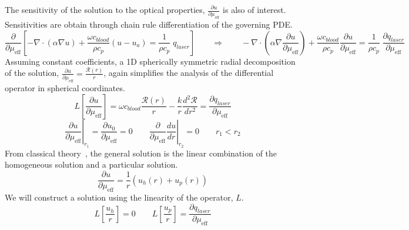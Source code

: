 \documentclass{article}         %
\theoremstyle{definition}
\theoremstyle{remark}
\begin{document}
The sensitivity of the solution to the optical properties, $\frac{\partial
u}{\partial \mu_\text{eff}}$ is also of
interest.
Sensitivities are obtain through chain rule differentiation of the governing
PDE.
\[
\frac{\partial}{\partial \mu_\text{eff}}
\left[
 -\nabla \cdot \left(   \alpha \nabla u  \right) 
 + \frac{\omega c_\textit{blood}}{\rho c_p} (u  - u_a )
 = \frac{1}{\rho c_p} \; q_{laser}
\right]
\qquad
\Rightarrow
\qquad
 -\nabla \cdot  \left(   \alpha \nabla  \frac{\partial u}{\partial \mu_\text{eff}} \right) 
 + \frac{\omega c_\textit{blood}}{\rho c_p} \frac{\partial u}{\partial \mu_\text{eff}}  
 = \frac{1}{\rho c_p} \;
   \frac{\partial q_{laser}}{\partial \mu_\text{eff}}
\]
Assuming constant coefficients, 
a 1D spherically symmetric radial decomposition 
of the solution,
$ \frac{\partial u}{\partial \mu_\text{eff}} = \frac{\mathcal{R}(r)}{r}$, again simplifies the analysis of the differential operator in
spherical coordinates.
\[
   L \left[\frac{\partial u}{\partial \mu_\text{eff}}\right] = 
    \omega c_\textit{blood}  \frac{ \mathcal{R}(r)}{r} 
   -
    \frac{k }{r}   \frac{d^2 \mathcal{R}}{dr^2}
   = 
   \frac{\partial q_{laser}}{\partial \mu_\text{eff}}
\]
\[
 \left.
 \frac{\partial u}{\partial \mu_\text{eff}} 
  \right|_{r_1}
  = 
 \frac{\partial u_0}{\partial \mu_\text{eff}} = 0
  \qquad
  \left. \frac{\partial }{\partial \mu_\text{eff}}
   \frac{d u}{dr} \right|_{r_2}  = 0
  \qquad
   r_1 < r_2
\]
From classical theory~\cite{boyce1992elementary}, 
the general solution is the linear combination of the homogeneous solution and
a particular solution. 
\[
 \frac{\partial u}{\partial \mu_\text{eff}} = 
  \frac{1}{r}
   \left(
  u_h(r)+ 
  u_p(r)
 \right)
\]
We will construct a solution using the linearity of the operator, $L$.
\[
  L \left[\frac{u_h}{r} \right] =  0 
  \qquad
  L \left[\frac{u_p}{r} \right] =  
   \frac{\partial q_{laser}}{\partial \mu_\text{eff}}
\]
\end{document}
